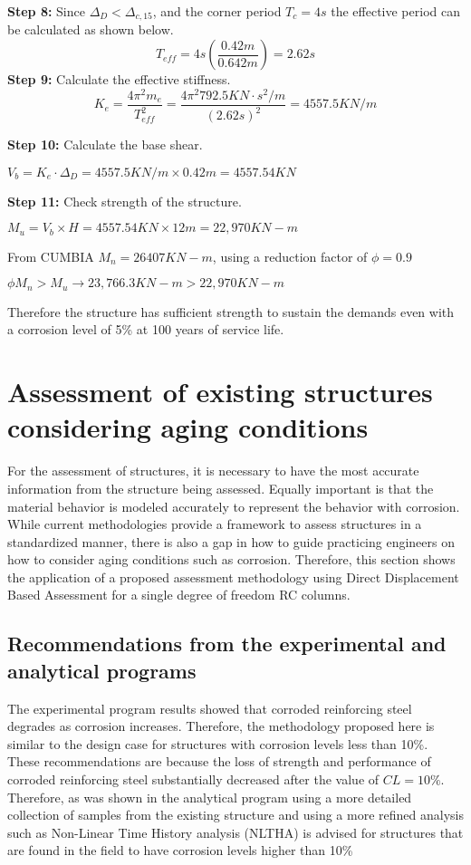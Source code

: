 \textbf{Step 8:} Since $\Delta_{D}<\Delta_{c,15}$, and the corner period $T_{c}=4s$ the effective period can be calculated as shown below.
\begin{displaymath}
    T_{eff}=4s \left(\frac{0.42m}{0.642m}\right)=2.62s
\end{displaymath}
\textbf{Step 9:} Calculate the effective stiffness.
\begin{displaymath}
    K_{e}=\frac{4\pi^2m_{e}}{T_{eff}^2}=\frac{4\pi^2 792.5 KN\cdot s^2/m}{(2.62s)^2}=4557.5 KN/m
\end{displaymath}

\textbf{Step 10:} Calculate the base shear.

$\displaystyle V_{b}=K_{e} \cdot \Delta_{D}= 4557.5 KN/m \times 0.42m = 4557.54 KN$

\textbf{Step 11:} Check strength of the structure.

$M_{u}=V_{b} \times H=4557.54 KN \times 12m = 22,970 KN-m$

From CUMBIA $M_{n} = 26407 KN-m$, using a reduction factor of $\phi=0.9$

$\phi M_{n}>M_{u} \to 23,766.3 KN-m > 22,970 KN-m$

Therefore the structure has sufficient strength to sustain the demands even with a corrosion level of 5\% at 100 years of service life.

\section{Assessment of existing structures considering aging conditions}
For the assessment of structures, it is necessary to have the most accurate information from the structure being assessed. Equally important is that the material behavior is modeled accurately to represent the behavior with corrosion. While current methodologies provide a framework to assess structures in a standardized manner, there is also a gap in how to guide practicing engineers on how to consider aging conditions such as corrosion. Therefore, this section shows the application of a proposed assessment methodology using Direct Displacement Based Assessment for a single degree of freedom RC columns. 

\subsection{Recommendations from the experimental and analytical programs}

The experimental program results showed that corroded reinforcing steel degrades as corrosion increases. Therefore, the methodology proposed here is similar to the design case for structures with corrosion levels less than 10\%. These recommendations are because the loss of strength and performance of corroded reinforcing steel substantially decreased after the value of $CL=10\%$. Therefore, as was shown in the analytical program using a more detailed collection of samples from the existing structure and using a more refined analysis such as Non-Linear Time History analysis (NLTHA) is advised for structures that are found in the field to have corrosion levels higher than 10\%

